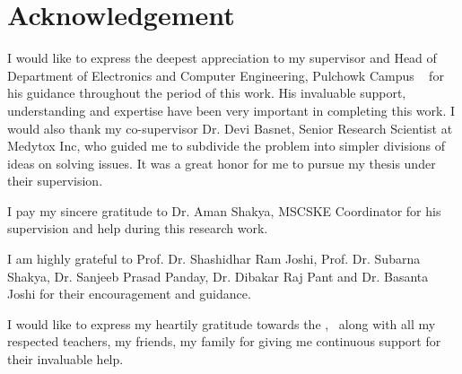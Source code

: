 
\chapter*{Acknowledgement}


I would like to express the deepest appreciation to my supervisor and Head of Department of Electronics and Computer Engineering, Pulchowk Campus \myadvisorA~ for his guidance throughout the period of this work. His invaluable support, understanding and expertise have been very important in completing this work. I would also thank my co-supervisor Dr. Devi Basnet, Senior Research Scientist at Medytox Inc, who guided me to subdivide the problem into simpler divisions of ideas on solving issues.  It was a great honor for me to pursue my thesis under their supervision.

I pay my sincere gratitude to Dr. Aman Shakya, MSCSKE Coordinator for his supervision and help during this research work.

I am highly grateful to Prof. Dr. Shashidhar Ram Joshi, Prof. Dr. Subarna Shakya, Dr. Sanjeeb Prasad Panday, Dr. Dibakar Raj Pant and Dr. Basanta Joshi for their encouragement and guidance.

I would like to express my heartily gratitude towards the \myinstitute, \mycampus ~along with all my respected teachers, my friends, my family for giving me continuous support for their invaluable help.


{\bf{\theauthor}}

{\bf{\roll}}


{\bf{\myinstitute}}


